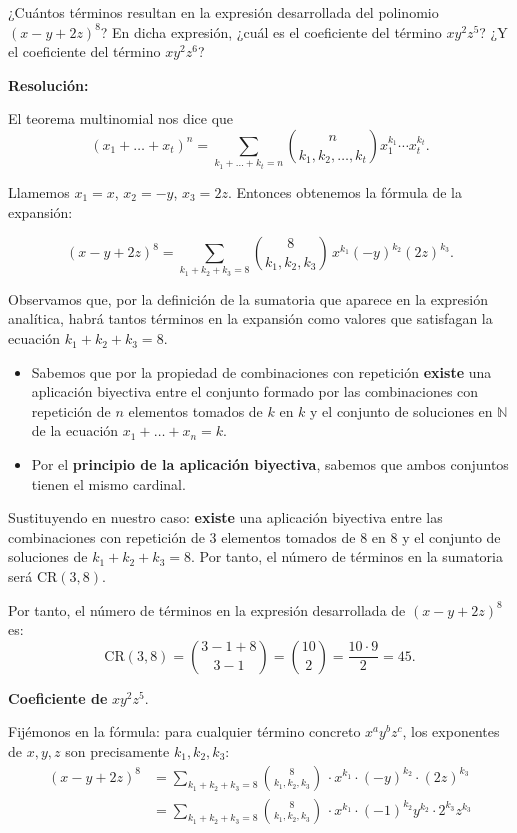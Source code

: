 \documentclass[a4paper,12pt]{article}
\begin{document}
\begin{ejercicio}[title=Ejercicio 25]
¿Cuántos términos resultan en la expresión desarrollada del polinomio $(x - y + 2z)^8$? En dicha expresión, ¿cuál es el coeficiente del término $xy^2z^5$? ¿Y el coeficiente del término $xy^2z^6$?

\tcblower
\textbf{Resolución:}

El teorema multinomial nos dice que
\[
(x_1+\dots+x_t)^n = \sum_{k_1+\dots+k_t=n} \binom{n}{k_1,k_2,\dots,k_t} x_1^{k_1}\cdots x_t^{k_t}.
\]

Llamemos $x_1=x$, $x_2=-y$, $x_3=2z$. Entonces obtenemos la fórmula de la expansión:

\[
(x-y+2z)^8 = \sum_{k_1+k_2+k_3=8} \binom{8}{k_1,k_2,k_3}\, x^{k_1}(-y)^{k_2}(2z)^{k_3}.
\]

\vspace{0.5em}

Observamos que, por la definición de la sumatoria que aparece en la expresión analítica, habrá tantos términos en la expansión como valores que satisfagan la ecuación $k_1+k_2+k_3=8$.

\vspace{0.5em}

\begin{itemize}
    \item Sabemos que por la propiedad de combinaciones con repetición \textbf{existe} una aplicación biyectiva entre el conjunto formado por las combinaciones con repetición de $n$ elementos tomados de $k$ en $k$ y el conjunto de soluciones en $\mathbb{N}$ de la ecuación $x_1+\dots+x_n=k$. 
    \item Por el \textbf{principio de la aplicación biyectiva}, sabemos que ambos conjuntos tienen el mismo cardinal.
\end{itemize}

\vspace{0.5em}

Sustituyendo en nuestro caso: \textbf{existe} una aplicación biyectiva entre las combinaciones con repetición de $3$ elementos tomados de $8$ en $8$ y el conjunto de soluciones de $k_1+k_2+k_3=8$. Por tanto, el número de términos en la sumatoria será $\mathrm{CR}(3,8)$.

\vspace{0.5em}

Por tanto, el número de términos en la expresión desarrollada de $(x-y+2z)^8$ es:
\[
\mathrm{CR}(3,8)=\binom{3-1+8}{3-1}=\binom{10}{2}=\frac{10\cdot 9}{2}=\boxed{45}.
\]

\medskip

\textbf{Coeficiente de } $xy^2z^5$.

Fijémonos en la fórmula: para cualquier término concreto $x^a y^b z^c$, los exponentes de $x,y,z$ son precisamente $k_1,k_2,k_3$:
\[
\begin{aligned}
    (x-y+2z)^8&=\sum_{k_1+k_2+k_3=8}\binom{8}{k_1,k_2,k_3}\, \cdot x^{k_1}\cdot (-y)^{k_2}\cdot (2z)^{k_3}\\
    &=\sum_{k_1+k_2+k_3=8}\binom{8}{k_1,k_2,k_3}\, \cdot x^{\boxed{k_1}}\cdot (-1)^{k_2}y^{\boxed{k_2}}\cdot 2^{k_3}z^{\boxed{k_3}}
\end{aligned}
\]

\end{ejercicio}
\end{document}
